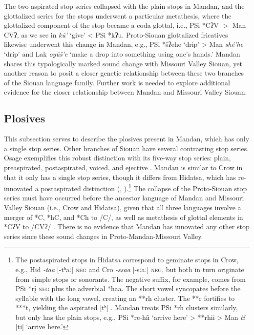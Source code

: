 The two aspirated stop series collapsed with the plain stops in Mandan, and the glottalized series for the stops underwent a particular metathesis, where the glottalized component of the stop became a coda glottal, i.e., PSi *CʔV $>$ Man CVʔ, as we see in \textit{kú'} `give' < PSi *kʔu. Proto-Siouan glottalized fricatives likewise underwent this change in Mandan, e.g., PSi *šʔehe `drip' > Man \textit{shé'he} `drip' and Lak \textit{oyúš'e} `make a drop into something using one's hands.' Mandan shares this typologically marked sound change with Missouri Valley Siouan, yet another reason to posit a closer genetic relationship between these two branches of the Siouan language family. Further work is needed to explore additional evidence for the closer relationship between Mandan and Missouri Valley Siouan.

\subsection{Plosives}\label{plosives}

This subsection serves to describe the plosives present in Mandan, which has only a single stop series. Other branches of Siouan have several contrasting stop series. Osage exemplifies this robust distinction with its five-way stop series: plain, preaspirated, postaspirated, voiced, and ejective \citep[17]{quintero2004}. Mandan is similar to Crow in that it only has a single stop series, though it differs from Hidatsa, which has re-innovated a postaspirated distinction (\citealt[27]{boyle2007}, \citealt[12]{graczyk2007}).\footnote{The postaspirated stops in Hidatsa correspond to geminate stops in Crow, e.g., Hid \textit{-taa} [-tʰaː] \textsc{neg} and Cro \textit{-ssaa} [-sːaː] \textsc{neg}, but both in turn originate from simple stops or sonorants. The negative suffix, for example, comes from PSi *rį \textsc{neg} plus the adverbial *haa. The short vowel syncopates before the syllable with the long vowel, creating an **rh cluster. The **r fortifies to ***t, yielding the aspirated [tʰ] \citep[8]{jones1983}. Mandan treats PSi *rh clusters similarly, but only has the plain stops, e.g., PSi *re-híi `arrive here' > **rhii > Man \textit{tí} [ti] `arrive here.'} The collapse of the Proto-Siouan stop series must have occurred before the ancestor language of Mandan and Missouri Valley Siouan (i.e., Crow and Hidatsa), given that all three languages involve a merger of *C, *hC, and *Ch to /C/, as well as metathesis of glottal elements in *CʔV to /CVʔ/ \citep{rankinetalnd}. There is no evidence that Mandan has innovated any other stop series since these sound changes in Proto-Mandan-Missouri Valley.

